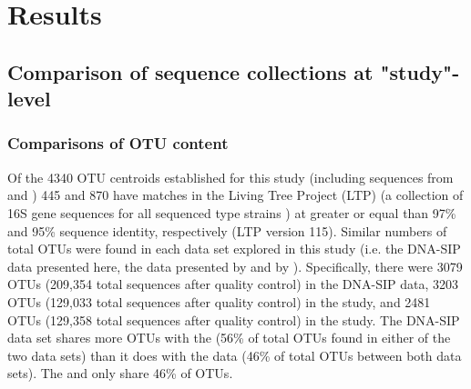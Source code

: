 \section{Results}

\subsection{Comparison of sequence collections at "study"-level}

\subsubsection{Comparisons of OTU content}
Of the 4340 OTU centroids established for this study (including sequences from \citet{Steven_2013} and \cite{Garcia_Pichel_2013}) 445 and 870 have matches in the Living Tree Project (LTP) (a collection of 16S gene sequences for all sequenced type strains \cite{Yarza_2008}) at greater or equal than 97\% and 95\% sequence identity, respectively (LTP version 115). Similar numbers of total OTUs were found in each data set explored in this study (i.e. the DNA-SIP data presented here, the data presented by \citet{Steven_2013} and by \citet{Garcia_Pichel_2013}). Specifically, there were 3079 OTUs (209,354 total sequences after quality control) in the DNA-SIP data, 3203 OTUs (129,033 total sequences after quality control) in the \citet{Garcia_Pichel_2013} study, and 2481 OTUs (129,358 total sequences after quality control) in the \citet{Steven_2013} study. The DNA-SIP data set shares more OTUs with the \citet{Steven_2013} (56\% of total OTUs found in either of the two data sets) than it does with the \citet{Garcia_Pichel_2013} data (46\% of total OTUs between both data sets). The \citet{Steven_2013} and \citet{Garcia_Pichel_2013} only share 46\% of OTUs.

